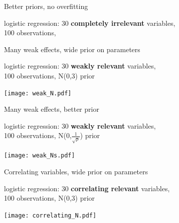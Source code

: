 \documentclass[english,t]{beamer}
\begin{document}
\begin{frame}{Better priors, no overfitting}

  logistic regression: 30 \textbf{completely irrelevant} variables, \\100
  observations,
  
  
\end{frame}

\begin{frame}{Many weak effects, wide prior on parameters}

  logistic regression: 30 \textbf{weakly relevant} variables, \\100
  observations, N(0,3) prior
  
  {\texttt{[image: weak\_N.pdf]}}

\end{frame}

\begin{frame}{Many weak effects, better prior}

  logistic regression: 30 \textbf{weakly relevant} variables, \\100
  observations, N(0,$\frac{1}{\sqrt{p}}$) prior
  
  {\texttt{[image: weak\_Ns.pdf]}}

\end{frame}

\begin{frame}{Correlating variables, wide prior on parameters}

  logistic regression: 30 \textbf{correlating relevant} variables, \\100
  observations, N(0,3) prior
  
  {\texttt{[image: correlating\_N.pdf]}}

\end{frame}
\end{document}
